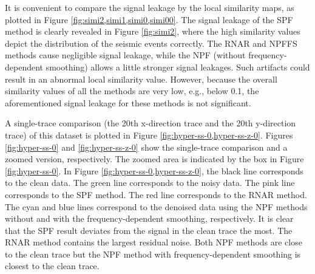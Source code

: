 It is convenient to compare the signal leakage by the local similarity maps, as plotted in Figure \ref{fig:simi2,simi1,simi0,simi00}. The signal leakage of the SPF method is clearly revealed in Figure \ref{fig:simi2}, where the high similarity values depict the distribution of the seismic events correctly. The RNAR and NPFFS methods cause negligible signal leakage, while the NPF (without frequency-dependent smoothing) allows a little stronger signal leakages. 
 Such  artifacts could result in an abnormal local similarity value. However, because the overall similarity values of all the methods are very low, e.g., below 0.1, the aforementioned signal leakage for these methods is not significant. 

A single-trace comparison (the 20th x-direction trace and the 20th y-direction trace) of this dataset is plotted in Figure \ref{fig:hyper-ss-0,hyper-ss-z-0}. Figures \ref{fig:hyper-ss-0} and \ref{fig:hyper-ss-z-0} show the single-trace comparison and a zoomed version, respectively. The zoomed area is indicated by the box in Figure \ref{fig:hyper-ss-0}. In Figure \ref{fig:hyper-ss-0,hyper-ss-z-0}, the black line corresponds to the clean data. The green line corresponds to the noisy data. The pink line corresponds to the SPF method. The red line corresponds to the RNAR method.  The cyan and blue lines correspond to the denoised data using the NPF methods without and with  the frequency-dependent smoothing, respectively. It is clear that the SPF result deviates from the signal in the clean trace the most. The RNAR method contains the largest residual noise. Both NPF methods are close to the clean trace but the NPF method with frequency-dependent smoothing is closest to the clean trace.
%
%

